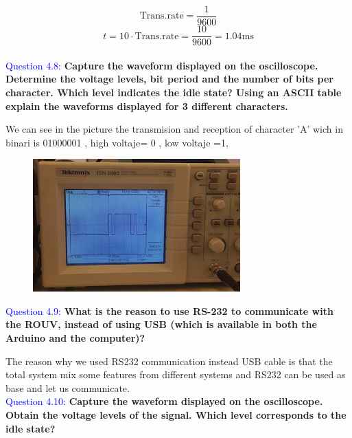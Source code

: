 \documentclass[12pt, a4papre]{article}
\begin{document}
	\[
	\text{Trans.rate} = \frac{1}{9600}
	\]
	\[
	t = 10\cdot \text{Trans.rate} = \frac{10}{9600} = 1.04 \text{ms}
	\]\\

	\textcolor{blue}{Question 4.8:} \textbf{Capture the waveform displayed on the oscilloscope. Determine the voltage levels, bit period and the number of bits per character. Which level indicates the idle state? Using an ASCII table explain the waveforms displayed for 3 different characters.}
	
	We can see in the picture the transmision and reception of character 'A' wich in binari is 01000001 , high voltaje= 0 , low voltaje =1,
	
	\begin{figure}[H]
		\begin{center}
		\includegraphics[width=80mm]{LletraA4_8.png}
		\end{center}
	\end{figure}

	\textcolor{blue}{Question 4.9:} \textbf{What is the reason to use RS-232 to communicate with the ROUV, instead of using USB (which is available in both the Arduino and the computer)?}
	
	The reason why we used RS232 communication instead USB cable is that the total system mix some features from different systems and RS232 can be used as base and let us communicate.\\

	\textcolor{blue}{Question 4.10:} \textbf{Capture the waveform displayed on the oscilloscope. Obtain the voltage levels of the signal. Which level corresponds to the idle state?}
	
\end{document}
